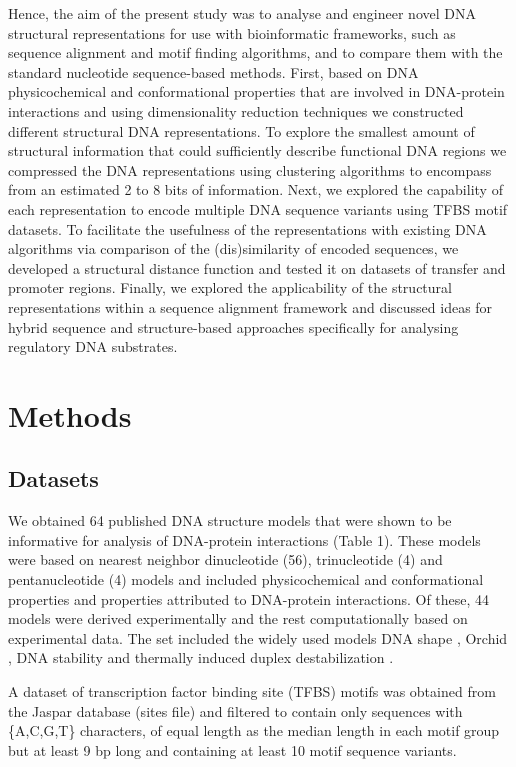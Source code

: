 \documentclass[10pt]{article}
\begin{document}
Hence, the aim of the present study was to analyse and engineer novel DNA structural representations for use with bioinformatic frameworks, such as sequence alignment and motif finding algorithms, and to compare them with the standard nucleotide sequence-based methods. First, based on DNA physicochemical and conformational properties that are involved in DNA-protein interactions and using dimensionality reduction techniques we constructed different structural DNA representations. To explore the smallest amount of structural information that could sufficiently describe functional DNA regions we compressed the DNA representations using clustering algorithms to encompass from an estimated 2 to 8 bits of information. Next, we explored the capability of each representation to encode multiple DNA sequence variants using TFBS motif datasets. To facilitate the usefulness of the representations with existing DNA algorithms via comparison of the (dis)similarity of encoded sequences, we developed a structural distance function and tested it on datasets of transfer and promoter regions. Finally, we explored the applicability of the structural representations within a sequence alignment framework and discussed ideas for hybrid sequence and structure-based approaches specifically for analysing regulatory DNA substrates.


\section{Methods}
\subsection{Datasets}
We obtained 64 published DNA structure models that were shown to be informative for analysis of DNA-protein interactions \cite{Zrimec2020-wx} (Table 1). These models were based on nearest neighbor dinucleotide (56), trinucleotide (4) and pentanucleotide (4) models and included physicochemical and conformational properties and properties attributed to DNA-protein interactions. Of these, 44 models were derived experimentally and the rest computationally based on experimental data. The set included the widely used models DNA shape \cite{Rohs2009-hm,Chiu2016-kb}, Orchid \cite{Bishop2011-jm}, DNA stability and thermally induced duplex destabilization \cite{SantaLucia1998-hc,Zrimec2015-xf}. 

A dataset of transcription factor binding site (TFBS) motifs was obtained from the Jaspar database \cite{Khan2018-wj} (sites file) and filtered to contain only sequences with \{A,C,G,T\} characters, of equal length as the median length in each motif group but at least 9 bp long and containing at least 10 motif sequence variants.
\end{document}
